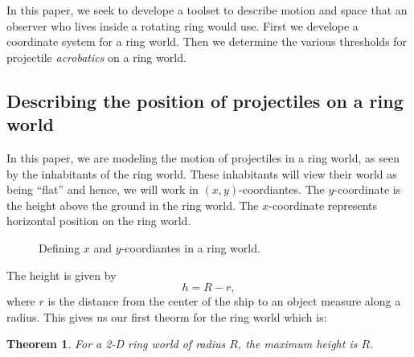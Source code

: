 \documentclass{amsart}
\newtheorem{theorem}{Theorem}[section]
\theoremstyle{definition}
\begin{document}
In this paper, we seek to develope a toolset to describe motion and space that an observer
 who lives inside a rotating ring would use. First we develope a coordinate system for a ring world. 
 Then we determine the various thresholds for projectile \textit{acrobatics} on a ring world. 


\subsection{Describing the position of projectiles on a ring world}

In this paper, we are modeling the motion of projectiles in a ring
world, as seen by the inhabitants of the ring world. These inhabitants
will view their world as being ``flat'' and hence, we will work in
$(x,y)$-coordiantes.  The $y$-coordinate is the height above the
ground in the ring world.  The $x$-coordinate represents horizontal
position on the ring world.  



\begin{figure}
  \caption{Defining $x$ and $y$-coordiantes in a ring world.}
  \label{fig:vertical}
\end{figure}


The height is given by
\[
h = R - r,
\]
where $r$ is the distance from the center of the ship to an object
measure along a radius. This gives us our first theorm for the ring
world which is:

\begin{theorem}
  For a 2-D ring world of radius $R$, the maximum height is $R$.
\end{theorem}
\end{document}

